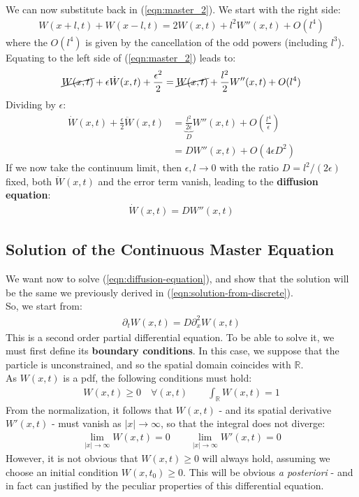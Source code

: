 \documentclass[../template.tex]{subfiles}
\begin{document}
We can now substitute back in (\ref{eqn:master_2}). We start with the right side:
\begin{align*}
    W(x+l,t) + W(x-l, t) = 2 W(x,t) + l^2 W''(x,t) + O(l^4)
\end{align*}
where the $O(l^4)$ is given by the cancellation of the odd powers (including $l^3$). Equating to the left side of (\ref{eqn:master_2}) leads to:  
\begin{align*}
    \cancel{W(x,t)}+ \epsilon \dot{W}(x,t) + \frac{\epsilon^2}{2} = \cancel{W(x,t)} + \frac{l^2}{2} W''(x,t) + O(l^4)  
\end{align*}
Dividing by $\epsilon$:
\begin{align*}
    \dot{W}(x,t) + \frac{\epsilon}{2} \ddot{W}(x,t) &= \underbrace{\frac{l^2}{2 \epsilon}}_{D}  W''(x,t) + O\left(\frac{l^4}{\epsilon} \right)  \\
    &= D W''(x,t) + O(4 \epsilon D^2)
\end{align*} 
If we now take the continuum limit, then $\epsilon, l \to 0$ with the ratio $D = l^2/(2\epsilon)$ fixed, both $\ddot{W}(x,t)$ and the error term vanish, leading to the \textbf{diffusion equation}: 
\begin{align}
    \dot{W}(x,t) = D W''(x,t)
    \label{eqn:diffusion-equation}
\end{align}  

\subsection{Solution of the Continuous Master Equation}
We want now to solve (\ref{eqn:diffusion-equation}), and show that the solution will be the same we previously derived in (\ref{eqn:solution-from-discrete}).\\
So, we start from:
\begin{align*}
    \partial_t W(x,t) = D \partial_x^2 W(x,t)
\end{align*}
This is a second order partial differential equation. To be able to solve it, we must first define its \textbf{boundary conditions}. In this case, we suppose that the particle is unconstrained, and so the spatial domain coincides with $\mathbb{R}$.\\
As $W(x,t)$ is a pdf, the following conditions must hold:
\begin{align*}
    W(x,t) \geq 0 \quad \forall (x,t) \qquad \int_{\mathbb{R}} W(x,t) = 1
\end{align*}   
From the normalization, it follows that $W(x,t)$ - and its spatial derivative $W'(x,t)$ - must vanish as $|x| \to \infty$, so that the integral does not diverge:
\begin{align*}
    \lim_{|x| \to \infty} W(x,t) = 0 \qquad \lim_{|x| \to \infty} W'(x,t) = 0
\end{align*}   
However, it is not obvious that $W(x,t) \geq 0$ will always hold, assuming we choose an initial condition $W(x,t_0) \geq 0$. This will be obvious \textit{a posteriori} - and in fact can justified by the peculiar properties of this differential equation.\\
\end{document}
